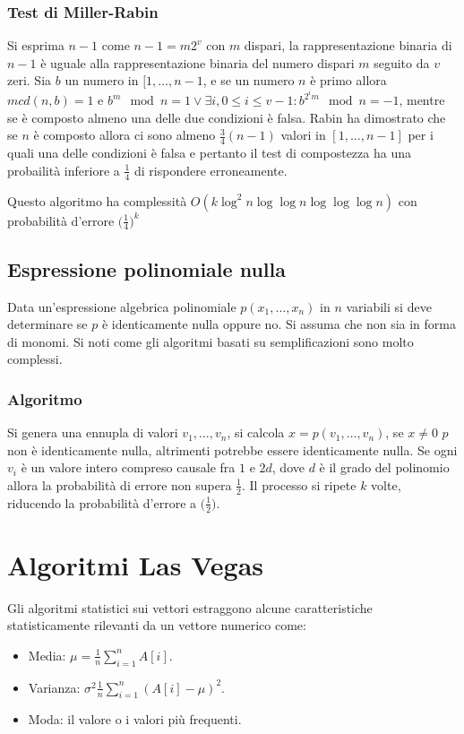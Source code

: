 \subsubsection{Test di Miller-Rabin}
Si esprima $n-1$ come $n-1 = m2^v$ con $m$ dispari, la rappresentazione binaria di $n-1$ \`e uguale alla rappresentazione binaria del numero dispari $m$ seguito da $v$ zeri. Sia $b$
un numero in $[1, \dots, n - 1$, e se un numero $n$ \`e primo allora $mcd(n, b) = 1$ e $b^m\mod n = 1\lor \exists i, 0\le i \le v -1: b^{2^im}\mod n = -1$, mentre se \`e composto almeno 
una delle due condizioni \`e falsa. Rabin ha dimostrato che se $n$ \`e composto allora ci sono almeno $\frac{3}{4}(n - 1)$ valori in $[1, \dots, n - 1]$ per i quali una delle condizioni
\`e falsa e pertanto il test di compostezza ha una probailit\`a inferiore a $\frac{1}{4}$ di rispondere erroneamente. 

Questo algoritmo ha complessit\`a $O(k\log^2 n\log\log n\log\log\log n)$ con probabilit\`a d'errore $\bigl(\frac{1}{4}\bigr)^k$
\subsection{Espressione polinomiale nulla}
Data un'espressione algebrica polinomiale $p(x_1, \dots, x_n)$ in $n$ variabili si deve determinare se $p$ \`e identicamente nulla oppure no. Si assuma che non sia in forma di monomi. Si
noti come gli algoritmi basati su semplificazioni sono molto complessi. 
\subsubsection{Algoritmo}
Si genera una ennupla di valori $v_1, \dots, v_n$, si calcola $x = p(v_1, \dots, v_n)$, se $x\neq 0$ $p$ non \`e identicamente nulla, altrimenti potrebbe essere identicamente nulla. Se 
ogni $v_i$ \`e un valore intero compreso causale fra $1$ e $2d$, dove $d$ \`e il grado del polinomio allora la probabilit\`a di errore non supera $\frac{1}{2}$. Il processo si ripete
$k$ volte, riducendo la probabilit\`a d'errore a $\bigl(\frac{1}{2}\bigr)$.
\section{Algoritmi Las Vegas}
Gli algoritmi statistici sui vettori estraggono alcune caratteristiche statisticamente rilevanti da un vettore numerico come:
\begin{itemize}
	\item Media: $\mu = \frac{1}{n}\sum\limits_{i = 1}^n A[i]$.
	\item Varianza: $\sigma^2 \frac{1}{n}\sum\limits_{i = 1}^n(A[i] - \mu)^2$.
	\item Moda: il valore o i valori pi\`u frequenti. 
\end{itemize}
